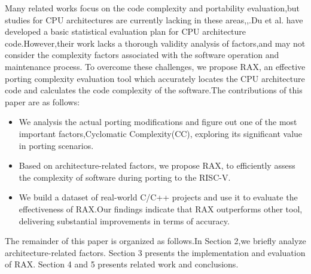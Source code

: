 \documentclass[sigconf,screen,review,anonymous]{acmart}
\begin{document}
Many related works focus on the code complexity and portability evaluation,but studies for CPU architectures are currently lacking in these areas\cite{2016helei},\cite{TAHIR2016101},\cite{Sholiq_2021}.Du et al. have developed a basic statistical evaluation plan for CPU architecture code\citep{2023du}.However,their work lacks a thorough validity analysis of factors,and may not consider the complexity factors associated with the software operation and maintenance process.
To overcome these challenges, we propose RAX, an effective porting
complexity evaluation tool which accurately locates the CPU architecture code and calculates the code complexity of the software.The contributions of this paper are as follows:
\begin{itemize}
  \item We analysis the actual porting modifications and figure out one of the most important factors,Cyclomatic Complexity(CC), exploring its significant value in porting scenarios.
  \item Based on architecture-related factors, we propose RAX, to efficiently assess the complexity of software during porting to the RISC-V.
  \item We build a dataset of real-world C/C++ projects and use it to evaluate the effectiveness of RAX.Our findings indicate that RAX outperforms other tool, delivering substantial improvements in terms of accuracy.
\end{itemize}
The remainder of this paper is organized as follows.In Section 2,we briefly analyze architecture-related factors. Section 3 presents the implementation and evaluation of RAX. Section 4 and 5 presents related work and conclusions.

\end{document}
